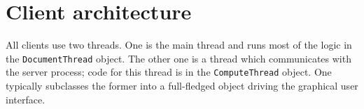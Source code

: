 
\section{Client architecture}

All clients use two threads. One is the main thread and runs most of
the logic in the {\tt DocumentThread} object. The other one is a
thread which communicates with the server process; code for this
thread is in the {\tt ComputeThread} object.  One typically subclasses
the former into a full-fledged object driving the graphical user
interface.
